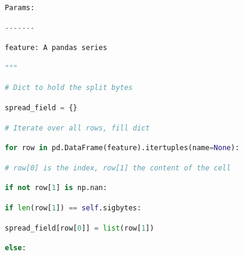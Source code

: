 \documentclass[
  11pt,
  a4paper,
  DIV=12,captions=tableheading,oneside]{scrbook}
\begin{document}
\begin{lstlisting}[language=Python,stepnumber=2,basicstyle=\footnotesize]
        Params:\end{lstlisting}
\begin{lstlisting}[language=Python,stepnumber=2,basicstyle=\footnotesize]
        -------\end{lstlisting}
\begin{lstlisting}[language=Python,stepnumber=2,basicstyle=\footnotesize]
        feature: A pandas series\end{lstlisting}
\begin{lstlisting}[language=Python,stepnumber=2,basicstyle=\footnotesize]
        """\end{lstlisting}
\begin{lstlisting}[language=Python,stepnumber=2,basicstyle=\footnotesize]
        # Dict to hold the split bytes\end{lstlisting}
\begin{lstlisting}[language=Python,stepnumber=2,basicstyle=\footnotesize]
        spread_field = {}\end{lstlisting}
\begin{lstlisting}[language=Python,stepnumber=2,basicstyle=\footnotesize]
        # Iterate over all rows, fill dict\end{lstlisting}
\begin{lstlisting}[language=Python,stepnumber=2,basicstyle=\footnotesize]
        for row in pd.DataFrame(feature).itertuples(name=None):\end{lstlisting}
\begin{lstlisting}[language=Python,stepnumber=2,basicstyle=\footnotesize]
            # row[0] is the index, row[1] the content of the cell\end{lstlisting}
\begin{lstlisting}[language=Python,stepnumber=2,basicstyle=\footnotesize]
            if not row[1] is np.nan:\end{lstlisting}
\begin{lstlisting}[language=Python,stepnumber=2,basicstyle=\footnotesize]
                if len(row[1]) == self.sigbytes:\end{lstlisting}
\begin{lstlisting}[language=Python,stepnumber=2,basicstyle=\footnotesize]
                    spread_field[row[0]] = list(row[1])\end{lstlisting}
\begin{lstlisting}[language=Python,stepnumber=2,basicstyle=\footnotesize]
                else:\end{lstlisting}
\end{document}
